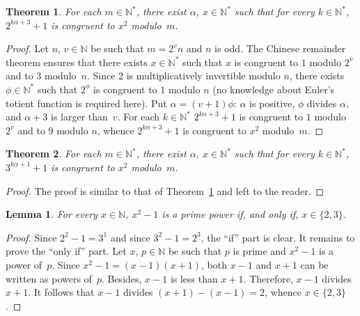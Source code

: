 \documentclass[12pt]{article}
\newcommand{\bZ}{\mathbb{Z}}
\newcommand{\bN}{\mathbb{N}} %
\newcommand{\bNast}{\bN^*}
\newtheorem{theorem}{Theorem}
\newtheorem{lemma}{Lemma}
\theoremstyle{definition}
\begin{document}
   \begin{theorem} \label{thm:pow-2-square-mod}
     For each $m \in \bNast$,
     there exist $\alpha$, $x \in \bNast$ such that for every  $k \in \bNast$, 
     $2^{k \alpha + 3} + 1$ is congruent to $x^2$  modulo~$m$.
   \end{theorem}



   \begin{proof}
     Let $n$, $v \in \bN$ be such that $m = 2^v n$ and $n$ is odd.
     The Chinese remainder theorem ensures that there exists $x \in \bNast$ such that
     $x$ is congruent to $1$ modulo $2^v$ and to $3$ modulo~$n$.
     Since $2$ is multiplicatively invertible modulo $n$,
     there exists $\phi \in \bNast$ such that $2^\phi$ is congruent to $1$ modulo $n$
     (no knowledge about Euler's totient function is required here).
     Put $\alpha = (v + 1) \phi$:
     $\alpha$ is positive,
     $\phi$ divides $\alpha$, and
     $\alpha + 3$ is larger than~$v$.
     For each $k \in \bNast$
     $2^{k \alpha + 3} + 1$ is congruent
     to $1$ modulo $2^v$ and
     to $9$ modulo $n$,
     whence $2^{k \alpha + 3} + 1$ is congruent to $x^2$ modulo~$m$.
   \end{proof}
     
   \begin{theorem}
     For each $m \in \bNast$,
     there exist $\alpha$, $x \in \bNast$ such that for every  $k \in \bNast$, 
     $3^{k \alpha + 1} + 1$ is congruent to $x^2$ modulo~$m$.
   \end{theorem}

   \begin{proof}
     The proof is similar to that of Theorem~\ref{thm:pow-2-square-mod} and left to the reader.
    \end{proof} 

    
  
     \begin{lemma} \label{lem:x2=q+1}
       For every $x \in \bN$, $x^2 - 1$ is a prime power if, and only if, $x \in \{ 2, 3 \}$. 
     \end{lemma}

     \begin{proof}
       Since  $2^2 - 1 = 3^1$ and since $3^2 - 1 = 2^3$, the ``if'' part is clear.
       It remains to prove the ``only if'' part.
       Let $x$, $p \in \bN$ be such that $p$ is prime and $x^2 - 1$ is a power of~$p$.
       Since  $x^2 - 1 = (x - 1)(x + 1)$, 
       both $x - 1$ and $x + 1$ can be written as powers of~$p$.
       Besides, $x - 1$ is less than $x + 1$.
       Therefore, $x - 1$ divides $x + 1$.
       It follows that $x - 1$ divides $(x + 1) - (x - 1) = 2$,
       whence $x \in \{ 2, 3 \}$.
    \end{proof} 
    
\end{document}
